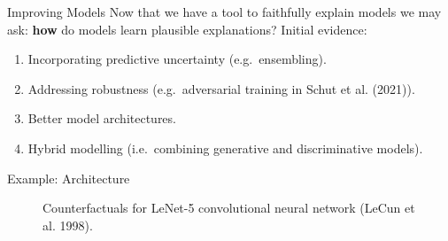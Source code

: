 \documentclass[
  ignorenonframetext,
]{beamer}
\providecommand{\tightlist}{%
  \setlength{\itemsep}{0pt}\setlength{\parskip}{0pt}}\usepackage{longtable,booktabs,array}
\theoremstyle{definition}
\theoremstyle{remark}
\begin{document}
\begin{frame}{Improving Models}
\label{improving-models}
Now that we have a tool to faithfully explain models we may ask:
\textbf{how} do models learn plausible explanations? Initial evidence:

\begin{enumerate}
\tightlist
\item
  Incorporating predictive uncertainty (e.g.~ensembling).
\item
  Addressing robustness (e.g.~adversarial training in Schut et al.
  (2021)).
\item
  Better model architectures.
\item
  Hybrid modelling (i.e.~combining generative and discriminative
  models).
\end{enumerate}
\end{frame}

\begin{frame}{Example: Architecture}
\label{example-architecture}
\begin{figure}


\caption{\label{fig-mnist-lenets}Counterfactuals for LeNet-5
convolutional neural network (LeCun et al. 1998).}

\end{figure}%
\end{frame}
\end{document}
